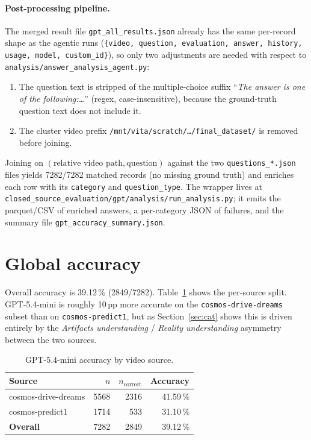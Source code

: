 \documentclass[11pt,a4paper]{article}
\newcommand{\pct}[1]{#1\,\%}
\newcommand{\code}[1]{\texttt{#1}}
\begin{document}
\paragraph{Post-processing pipeline.} The merged result file
\code{gpt\_all\_results.json} already has the same per-record shape as
the agentic runs (\code{\{video, question, evaluation, answer, history,
usage, model, custom\_id\}}), so only two adjustments are needed
with respect to \code{analysis/answer\_analysis\_agent.py}:
\begin{enumerate}
  \item The question text is stripped of the multiple-choice suffix
  ``\emph{The answer is one of the following:\dots}'' (regex, case-insensitive),
  because the ground-truth question text does not include it.
  \item The cluster video prefix
  \code{/mnt/vita/scratch/\dots/final\_dataset/} is removed before
  joining.
\end{enumerate}
Joining on \((\text{relative video path},\text{question})\) against the two
\code{questions\_*.json} files yields \num{7282}/\num{7282} matched
records (no missing ground truth) and enriches each row with its
\code{category} and \code{question\_type}. The wrapper lives at
\code{closed\_source\_evaluation/gpt/analysis/run\_analysis.py}; it
emits the parquet/CSV of enriched answers, a per-category JSON of
failures, and the summary file
\code{gpt\_accuracy\_summary.json}.

\section{Global accuracy}

Overall accuracy is \pct{39.12} (\num{2849}/\num{7282}). Table~\ref{tab:source}
shows the per-source split. GPT-5.4-mini is roughly 10\,pp more accurate
on the \code{cosmos-drive-dreams} subset than on \code{cosmos-predict1},
but as Section~\ref{sec:cat} shows this is driven entirely by the
\emph{Artifacts understanding} / \emph{Reality understanding} asymmetry
between the two sources.

\begin{table}[h]
\centering
\begin{tabular}{lrrr}
\toprule
Source & $n$ & $n_\mathrm{correct}$ & Accuracy \\
\midrule
cosmos-drive-dreams & \num{5568} & \num{2316} & \pct{41.59} \\
cosmos-predict1     & \num{1714} & \num{533}  & \pct{31.10} \\
\midrule
\textbf{Overall}    & \num{7282} & \num{2849} & \pct{39.12} \\
\bottomrule
\end{tabular}
\caption{GPT-5.4-mini accuracy by video source.}
\label{tab:source}
\end{table}
\end{document}

